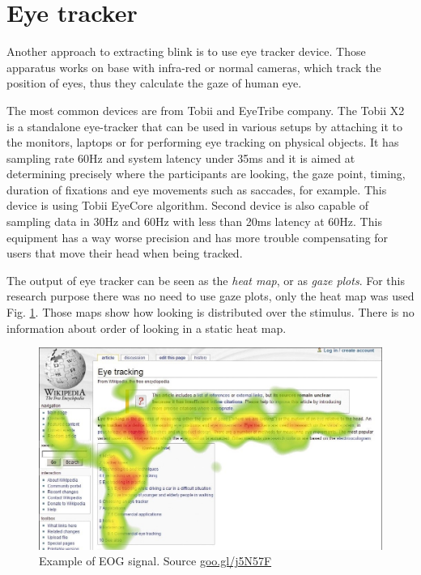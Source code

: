 \documentclass[conference]{IEEEtran}
\newcommand{\Ref}[1]{Fig. \ref{#1}}
\begin{document}
\section{Eye tracker}
Another approach to extracting blink is to use eye tracker device. Those apparatus works on base with infra-red or normal cameras, which track the position of eyes, thus they calculate the gaze of human eye. \par The most common devices are from Tobii and EyeTribe company. The Tobii X2 is a standalone eye-tracker that can be used in various setups by attaching it to the monitors, laptops or for performing eye tracking on physical objects. It has sampling rate 60Hz and system latency under 35ms and it is aimed at determining precisely where the participants are looking, the gaze point, timing, duration of fixations and eye movements such as saccades, for example. This device is using Tobii EyeCore algorithm. 
Second device is also capable of sampling data in 30Hz and 60Hz with less than 20ms latency at 60Hz. This equipment has a way worse precision and has more trouble compensating for users that move their head when being tracked.
\newline\par The output of eye tracker can be seen as the \textit{heat map}, or as \textit{gaze plots}. For this research purpose there was no need to use gaze plots, only the heat map was used \Ref{fig:heat_map}. Those maps show how looking is distributed over the stimulus. There is no information about order of looking in a static heat map.
\begin{figure}[!h]
	\center
	\includegraphics[scale = 0.6]{heat_map.jpg}
	\caption{Example of EOG signal. Source \url{goo.gl/j5N57F} }
	\label{fig:heat_map}
\end{figure}
\end{document}
